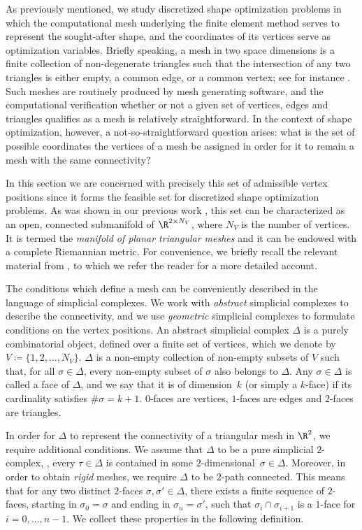 As previously mentioned, we study discretized shape optimization problems in which the computational mesh underlying the finite element method serves to represent the sought-after shape, and the coordinates of its vertices serve as optimization variables.
Briefly speaking, a mesh in two space dimensions is a finite collection of non-degenerate triangles such that the intersection of any two triangles is either empty, a common edge, or a common vertex; see for instance \cite[Chapter~3]{QuarteroniValli:1994:1}.
Such meshes are routinely produced by mesh generating software, and the computational verification whether or not a given set of vertices, edges and triangles qualifies as a mesh is relatively straightforward.
In the context of shape optimization, however, a not-so-straightforward question arises: what is the set of possible coordinates the vertices of a mesh be assigned in order for it to remain a mesh with the same connectivity?

In this section we are concerned with precisely this set of admissible vertex positions since it forms the feasible set for discretized shape optimization problems.
As was shown in our previous work \cite{HerzogLoayzaRomero:2022:1}, this set can be characterized as an open, connected submanifold of $\R^{2\times N_V}$, where $N_V$ is the number of vertices.
It is termed the \emph{manifold of planar triangular meshes} and it can be endowed with a complete Riemannian metric.
For convenience, we briefly recall the relevant material from \cite{HerzogLoayzaRomero:2022:1}, to which we refer the reader for a more detailed account.

The conditions which define a mesh can be conveniently described in the language of simplicial complexes.
We work with \emph{abstract} simplicial complexes to describe the connectivity, and we use \emph{geometric} simplicial complexes to formulate conditions on the vertex positions.
An abstract simplicial complex $\Delta$ is a purely combinatorial object, defined over a finite set of vertices, which we denote by $V \coloneqq \{1, 2, \ldots, N_V\}$.
$\Delta$ is a non-empty collection of non-empty subsets of $V$ such that, for all $\sigma \in \Delta$, every non-empty subset of $\sigma$ also belongs to $\Delta$.
Any $\sigma \in \Delta$ is called a face of $\Delta$, and we say that it is of dimension~$k$ (or simply a $k$-face) if its cardinality satisfies $\#\sigma = k+1$.
$0$-faces are vertices, $1$-faces are edges and $2$-faces are triangles.

In order for $\Delta$ to represent the connectivity of a triangular mesh in $\R^2$, we require additional conditions.
We assume that $\Delta$ to be a pure simplicial $2$-complex, \ie, every $\tau \in \Delta$ is contained in some $2$-dimensional~$\sigma \in \Delta$.
Moreover, in order to obtain \emph{rigid} meshes, we require $\Delta$ to be $2$-path connected.
This means that for any two distinct $2$-faces $\sigma, \sigma' \in \Delta$, there exists a finite sequence of $2$-faces, starting in $\sigma_0 = \sigma$ and ending in $\sigma_n = \sigma'$, such that $\sigma_i \cap \sigma_{i+1}$ is a $1$-face for $i = 0,\ldots, n - 1$.
We collect these properties in the following definition.

